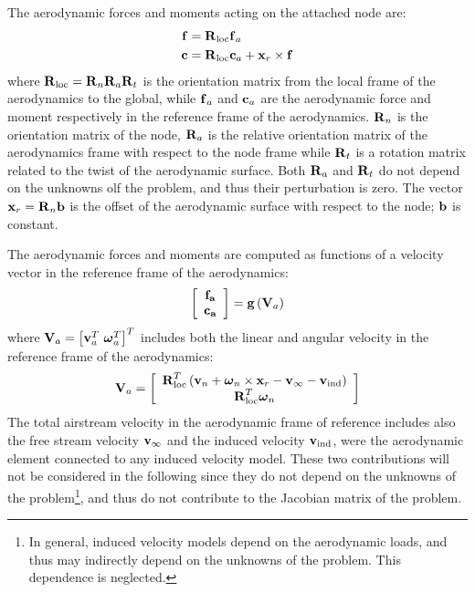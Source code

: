 The aerodynamic forces and moments acting on the attached node are:
\begin{subequations}
\begin{align}
	\T{f} &= \TT{R}_{\text{loc}} \T{f}_a\\ 
	\T{c} &= \TT{R}_{\text{loc}} \T{c}_a + \T{x}_r\times\T{f} 
\end{align}
\end{subequations}
where $\TT{R}_{\text{loc}} = \TT{R}_n\TT{R}_a\TT{R}_t$ is the orientation 
matrix from the local frame of the aerodynamics to the global, 
while $\T{f}_a$ and $\T{c}_a$ are the aerodynamic force and moment 
respectively in the reference frame of the aerodynamics. $\TT{R}_n$
is the orientation matrix of the node, $\TT{R}_a$ is the
relative orientation matrix of the aerodynamics frame with respect 
to the node frame while $\TT{R}_t$ is a rotation matrix 
related to the twist of the aerodynamic surface.
Both $\TT{R}_a$ and $\TT{R}_t$ do not depend on the unknowns
olf the problem, and thus their perturbation is zero.
The vector $\T{x}_r = \TT{R}_n\T{b}$ is the offset of the aerodynamic
surface with respect to the node; $\T{b}$ is constant.

The aerodynamic forces and moments are computed as functions 
of a velocity vector in the reference frame of the aerodynamics:
\begin{equation}\label{eq:fa=g(va)}
	\sqbr{\matr{c}{\T{f_a}\\\T{c_a}}} = \T{g}\plbr{\T{V}_{a}}
\end{equation}
where $\T{V}_{a} = \sqbr{\T{v}_a^T\ \T{\omega}_a^T}^T$ includes both the 
linear and angular velocity in the reference frame of the aerodynamics:
\begin{equation}
	\T{V}_{a} = \sqbr{\matr{c}{
		\TT{R}^T_{\text{loc}} \plbr{\T{v}_n + \T{\omega}_n\times\T{x}_r - \T{v}_{\infty} - \T{v}_{\text{ind}}}\\
		\TT{R}^T_{\text{loc}} \T{\omega}_n
		}}
\end{equation}
The total airstream velocity in the aerodynamic frame of reference 
includes also the free stream velocity $\T{v}_{\infty}$ and
the induced velocity $\T{v}_{\text{ind}}$, were the aerodynamic element
connected to any induced velocity model.
These two contributions will not be considered in the following
since they do not depend on the unknowns of the problem\footnote{In general,
induced velocity models depend on the aerodynamic loads,
and thus may indirectly depend on the unknowns of the problem.
This dependence is neglected.
}, and thus do not contribute to the Jacobian matrix of the problem. 

